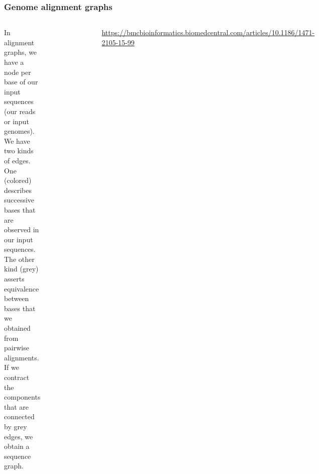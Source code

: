 \documentclass[aspectratio=169]{beamer}
\begin{document}
\begin{frame}
  \frametitle{Genome alignment graphs}

  \begin{columns}[c] %
    {\small 
  In alignment graphs, we have a node per base of our input sequences (our reads or input genomes).
  We have two kinds of edges.
  One (colored) describes successive bases that are observed in our input sequences.
  The other kind (grey) asserts equivalence between bases that we obtained from pairwise alignments.
  If we contract the components that are connected by grey edges, we obtain a sequence graph.
}
\begin{figure}
  \includegraphics[scale=0.7,center]{alignmentgraph.png}
\end{figure}

{\footnotesize \url{https://bmcbioinformatics.biomedcentral.com/articles/10.1186/1471-2105-15-99}}

\end{columns}



\end{frame}
\end{document}
